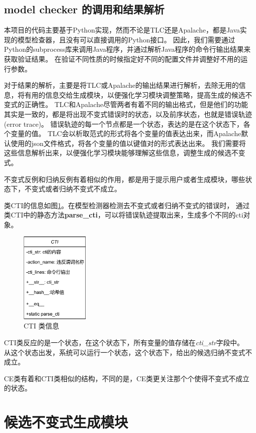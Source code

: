 \subsection{model checker 的调用和结果解析}
本项目的代码主要基于Python实现，然而不论是TLC还是Apalache，都是Java实现的模型检查器，且没有可以直接调用的Python接口。
因此，我们需要通过Python的subprocess库来调用Java程序，并通过解析Java程序的命令行输出结果来获取验证结果。
在验证不同性质的时候指定好不同的配置文件并调整好不用的运行参数。

对于结果的解析，主要是将TLC或Apalache的输出结果进行解析，去除无用的信息，将有用的信息交给生成模块，以便强化学习模块调整策略，提高生成的候选不变式的正确性。
TLC和Apalache尽管两者有着不同的输出格式，但是他们的功能其实是一致的，都是将出现不变式错误时的状态，以及前序状态，也就是错误轨迹(error trace)。
错误轨迹的每一个节点都是一个状态，表达的是在这个状态下，各个变量的值。
TLC会以析取范式的形式将各个变量的值表达出来，而Apalache默认使用的json文件格式，将各个变量的值以键值对的形式表达出来。
我们需要将这些信息解析出来，以便强化学习模块能够理解这些信息，调整生成的候选不变式。

不变式反例和归纳反例有着相似的作用，都是用于提示用户或者生成模块，哪些状态下，不变式或者归纳不变式不成立。

类CTI的信息如图\ref{fig:class_cti}。在模型检测器检测去不变式或者归纳不变式的错误时，
通过类CTI中的静态方法\textbf{parse\_cti}，可以将错误轨迹提取出来，生成多个不同的cti对象。
\begin{figure}[h]
    \centering
    \includegraphics[width=0.3\textwidth]{figures/class_cti.pdf}
    \caption{CTI 类信息}
    \label{fig:class_cti}
\end{figure}
CTI类反应的是一个状态，在这个状态下，所有变量的值存储在\textit{cti\_str}字段中。
从这个状态出发，系统可以运行一个状态，这个状态下，给出的候选归纳不变式不成立。

CE类有着和CTI类相似的结构，不同的是，CE类更关注那个个使得不变式不成立的状态。


\section{候选不变式生成模块}

